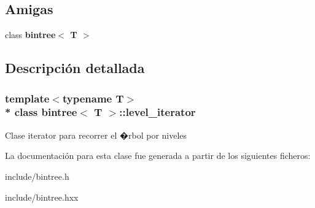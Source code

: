 \subsection*{Amigas}
\begin{DoxyCompactItemize}
\item 
class {\bfseries bintree$<$ T $>$}\hypertarget{classbintree_1_1level__iterator_a300e602ae13bd21fa092c5a5899e9eda}{}\label{classbintree_1_1level__iterator_a300e602ae13bd21fa092c5a5899e9eda}

\end{DoxyCompactItemize}


\subsection{Descripción detallada}
\subsubsection*{template$<$typename T$>$\\*
class bintree$<$ T $>$\+::level\+\_\+iterator}

Clase iterator para recorrer el �rbol por niveles 

La documentación para esta clase fue generada a partir de los siguientes ficheros\+:\begin{DoxyCompactItemize}
\item 
include/bintree.\+h\item 
include/bintree.\+hxx\end{DoxyCompactItemize}
